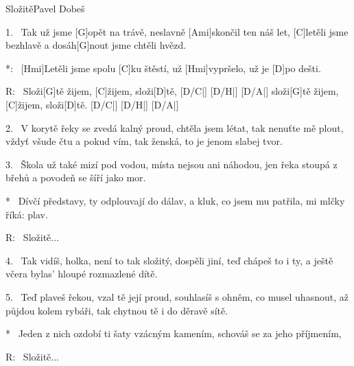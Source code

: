 \begin{song}{Složitě}{Pavel Dobeš}

\begin{xverse}{1.~}
Tak už jsme [\large G]opět na trávě,
neslavně [\large Ami]skončil ten náš let,
[\large C]letěli jsme bezhlavě
a dosáh[\large G]nout jsme chtěli hvězd.
\end{xverse}

\begin{xverse}{*:~}
[\large Hmi]Letěli jsme spolu [\large C]ku štěstí,
už [\large Hmi]vypršelo, už je [\large D]po dešti.
\end{xverse}

\begin{xverse}{R:~}
Složi[\large G]tě žijem, [\large C]{ži}jem, složi[\large D]tě, [\large D/C|]{} [\large D/H|]{} [\large D/A|]{}
složi[\large G]tě žijem, [\large C]{ži}jem, složi[\large D]tě. [\large D/C|]{} [\large D/H|]{} [\large D/A|]{}
\end{xverse}

\begin{xverse}{2.~}
V korytě řeky se zvedá kalný proud,
chtěla jsem létat, tak nenuťte mě plout,
vždyť všude čtu a pokud vím,
tak ženská, to je jenom slabej tvor.
\end{xverse}

\begin{xverse}{3.~}
Škola už také mizí pod vodou,
místa nejsou ani náhodou,
jen řeka stoupá z břehů
a povodeň se šíří jako mor.
\end{xverse}

\begin{xverse}{*~}
Dívčí představy, ty odplouvají do dálav,
a kluk, co jsem mu patřila, mi mlčky říká: plav.
\end{xverse}

\begin{xverse}{R:~}
Složitě...
\end{xverse}

\begin{xverse}{4.~}
Tak vidíš, holka, není to tak složitý,
dospěli jiní, teď chápeš to i ty,
a ještě včera bylas' hloupé rozmazlené dítě.
\end{xverse}

\begin{xverse}{5.~}
Teď plaveš řekou, vzal tě její proud,
souhlasíš s ohněm, co musel uhasnout,
až půjdou kolem rybáři, tak chytnou tě i do děravě sítě.
\end{xverse}

\begin{xverse}{*~}
Jeden z nich ozdobí ti šaty vzácným kamením,
schováš se za jeho příjmením,
\end{xverse}

\begin{xverse}{R:~}
Složitě...
\end{xverse}
\end{song}


